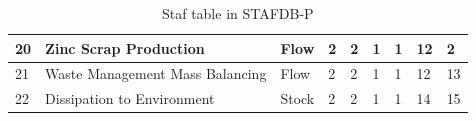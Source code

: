 \documentclass[ %
                    author={Tom Jager},
                supervisor={Dr. Daniel Schien},
                    degree={MEng},
                     title={A Bayesian Inference Engine for Calibrating Uncertainty over UMIS Structured MFA Systems},
                  subtitle={},
                      type={research},
                      year={2019} ]{dissertation}
\begin{document}
\begin{table}[]
\begin{tabular}{|p{1.1cm}|p{2cm}|p{1.5cm}|p{1.5cm}|p{1.5cm}|p{1.5cm}|p{1.5cm}|p{1.6cm}|p{1.5cm}|}
20                      & Zinc Scrap Production                     & Flow                                   & 2                                           & 2                                                & 1                                   & 1                                                & 12                                 & 2                                       \\ \hline
21                      & Waste Management Mass Balancing           & Flow                                   & 2                                           & 2                                                & 1                                   & 1                                                & 12                                 & 13                                      \\ \hline
22                      & Dissipation to Environment                & Stock                                  & 2                                           & 2                                                & 1                                   & 1                                                & 14                                 & 15                                      \\ \hline
\end{tabular}
\caption{Staf table in STAFDB-P}
\end{table}
\end{document}
